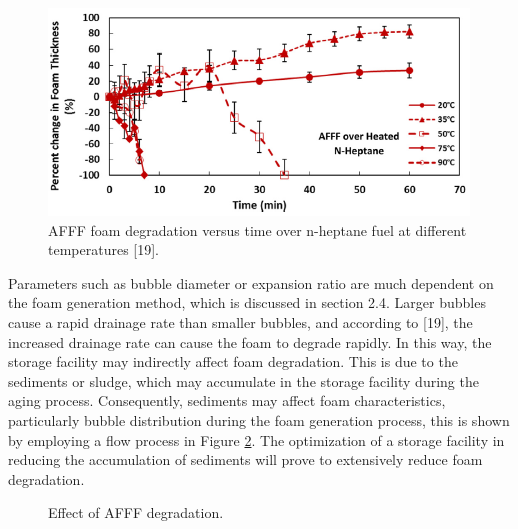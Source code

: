 \documentclass[12pt]{report}
\begin{document}
\begin{figure}[H]
    \centering
    \includegraphics[width=\textwidth]{foam_degradation.png}
    \caption{AFFF foam degradation versus time over n-heptane fuel at different temperatures [19].}
    \label{ch2:figure:degradation}
\end{figure}

Parameters such as bubble diameter or expansion ratio are much dependent on the foam generation method, which is discussed in section 2.4. Larger bubbles cause a rapid drainage rate than smaller bubbles, and according to [19], the increased drainage rate can cause the foam to degrade rapidly. In this way, the storage facility may indirectly affect foam degradation. This is due to the sediments or sludge, which may accumulate in the storage facility during the aging process. Consequently, sediments may affect foam characteristics, particularly bubble distribution during the foam generation process, this is shown by employing a flow process in Figure \ref{ch2:figure:effect}. The optimization of a storage facility in reducing the accumulation of sediments will prove to extensively reduce foam degradation.

\begin{figure}[H]
    \centering
    \begin{adjustbox}{center}
    \end{adjustbox}
    \caption{Effect of AFFF degradation.}
    \label{ch2:figure:effect}
\end{figure}
\end{document}
